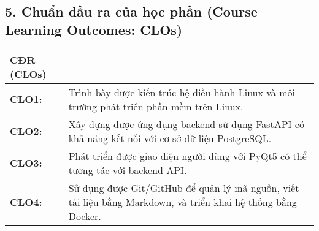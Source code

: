 \subsection*{5. Chuẩn đầu ra của học phần (Course Learning Outcomes: CLOs)}
\begin{longtable}{|>{\centering\arraybackslash}m{2cm}|>{\raggedright\arraybackslash}m{13cm}|}
\hline
\textbf{CĐR (CLOs)} & \multicolumn{1}{|>{\centering\arraybackslash}m{13cm}|}{\textbf{Nội dung CĐR học phần (CLOs)}} \\
\hline
\textbf{CLO1:} & Trình bày được kiến trúc hệ điều hành Linux và môi trường phát triển phần mềm trên Linux. \\
\hline
\textbf{CLO2:} & Xây dựng được ứng dụng backend sử dụng FastAPI có khả năng kết nối với cơ sở dữ liệu PostgreSQL. \\
\hline
\textbf{CLO3:} & Phát triển được giao diện người dùng với PyQt5 có thể tương tác với backend API. \\
\hline
\textbf{CLO4:} & Sử dụng được Git/GitHub để quản lý mã nguồn, viết tài liệu bằng Markdown, và triển khai hệ thống bằng Docker. \\
\hline
\end{longtable}